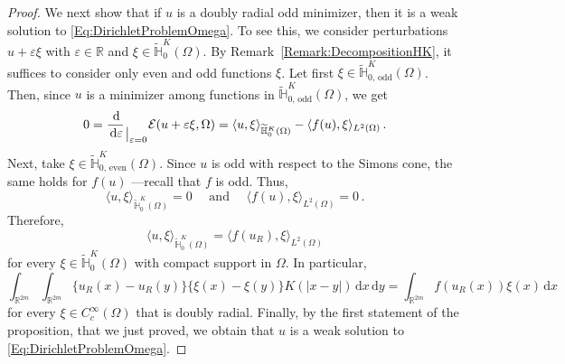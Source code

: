 \documentclass[12pt,reqno]{amsart}
\theoremstyle{definition}
\theoremstyle{remark}
\newcommand{\con}[1]{\mathbb{#1}}
\newcommand{\R}{\con{R}} %
\renewcommand{\H}{\con{H}}
\newcommand{\ecal}{\mathcal{E}}
\renewcommand{\d}{\,\mathrm{d}} %
\newcommand\evalat[1]{_{\mkern1.5mu\big\vert_{\scriptstyle #1}}}
\numberwithin{equation}{section}
\begin{document}
\begin{proof}
		
		We next show that if $u$ is a doubly radial odd minimizer, then it is a weak solution to \eqref{Eq:DirichletProblemOmega}. To see this, we consider perturbations $u +  \varepsilon \xi$ with $\varepsilon\in \R$ and $\xi \in \widetilde{\H}^K_{0}(\Omega)$. By Remark~\ref{Remark:DecompositionHK}, it suffices to consider only even and odd functions $\xi$. Let first $\xi \in \widetilde{\H}^K_{0, \,\mathrm{odd}}(\Omega)$. Then, since $u$ is a minimizer among functions in $\widetilde{\H}^K_{0, \,\mathrm{odd}}(\Omega)$, we get
		$$
		0 = \dfrac{\d}{\d \varepsilon}\evalat{\varepsilon = 0} \ecal(u +  \varepsilon \xi, \Omega) = \langle u,\xi \rangle_{\widetilde{\H}^K_0(\Omega)} - \langle f(u),\xi \rangle_{L^2(\Omega)}\,.
		$$
		Next, take $\xi \in \widetilde{\H}^K_{0, \,\mathrm{even}}(\Omega)$. Since $u$ is odd with respect to the Simons cone, the same holds for $f(u)$ ---recall that $f$ is odd. Thus,
		$$
		\langle u,\xi \rangle_{\widetilde{\H}^K_0(\Omega)} = 0 \quad \textrm{ and } \quad  \langle f(u),\xi \rangle_{L^2(\Omega)} = 0\,.
		$$
		Therefore, 
		$$
		\langle u,\xi \rangle_{\widetilde{\H}^K_0(\Omega)} = \langle f(u_R),\xi \rangle_{L^2(\Omega)}
		$$
		for every $\xi \in\widetilde{\H}^K_0(\Omega)$ with compact support in  $\Omega$. In particular,
		$$
		\int_{\R^{2m}}\int_{\R^{2m}} \{u_R(x)-u_R(y)\}\{\xi(x)-\xi(y)\} K(|x-y|) \d x \d y = \int_{\R^{2m}} f(u_R(x)) \xi(x) \d x
		$$
		for every $\xi \in C^\infty_c(\Omega)$ that is doubly radial. Finally, by the first statement of the proposition, that we just proved, we obtain that $u$ is a weak solution to \eqref{Eq:DirichletProblemOmega}.
	\end{proof}
	
	
	
\end{document}
